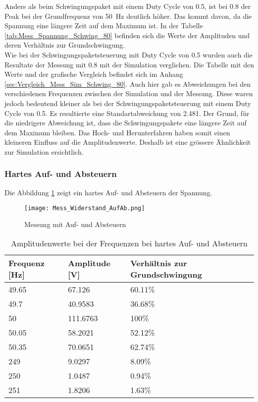 Anders als beim Schwingungspaket mit einem Duty Cycle von 0.5, ist bei 0.8 der Peak bei der Grundfrequenz von \SI{50}{Hz} deutlich höher. Das kommt davon, da die Spannung eine längere Zeit auf dem Maximum ist.
In der Tabelle \ref{tab:Mess_Spannung_Schwing_80} befinden sich die Werte der Amplituden und deren Verhältnis zur Grundschwingung.\\
Wie bei der Schwingungspaketsteuerung mit Duty Cycle von 0.5 wurden auch die Resultate der Messung mit 0.8 mit der Simulation verglichen. Die Tabelle mit den Werte und der grafische Vergleich befindet sich im Anhang \ref{sec:Vergleich_Mess_Sim_Schwing_80}. Auch hier gab es Abweichungen bei den verschiedenen Frequenzen zwischen der Simulation und der Messung. Diese waren jedoch bedeutend kleiner als bei der Schwingungspaketsteuerung mit einem Duty Cycle von 0.5. Es resultierte eine Standartabweichung von 2.481. Der Grund, für die niedrigere Abweichung ist, dass die Schwingungspakete eine längere Zeit auf dem Maximum bleiben. Das Hoch- und Herunterfahren haben somit einen kleineren Einfluss auf die Amplitudenwerte. Deshalb ist eine grössere Ähnlichkeit zur Simulation ersichtlich.



\newpage
\subsubsection*{Hartes Auf- und Absteuern}
Die Abbildung \ref{fig:Mess_Sanft} zeigt ein hartes Auf- und Absteuern der Spannung.

\begin{figure}[ht!]
	\centering
	\texttt{[image: Mess\_Widerstand\_AufAb.png]}	
	\caption{Messung mit Auf- und Absteuern}\label{fig:Mess_Sanft}
\end{figure}


\begin{table}[ht!]
	\centering
	\begin{tabular}{|l|l|l|}
		\hline
		Frequenz {[}Hz{]} & Amplitude {[}V{]} & Verhältnis zur Grundschwingung \\ \hline
		49.65             & 67.126            & 60.11\%                        \\ \hline
		49.7              & 40.9583           & 36.68\%                        \\ \hline
		50                & 111.6763          & 100\%                          \\ \hline
		50.05             & 58.2021           & 52.12\%                        \\ \hline
		50.35             & 70.0651           & 62.74\%                        \\ \hline
		249               & 9.0297            & 8.09\%                         \\ \hline
		250               & 1.0487            & 0.94\%                         \\ \hline
		251 		      & 1.8206            & 1.63\%                         \\ \hline
	\end{tabular}
\caption{Amplitudenwerte bei der Frequenzen bei hartes Auf- und Absteuern}\label{tab:Mess_Spannung_AufAb_hart}
\end{table}

